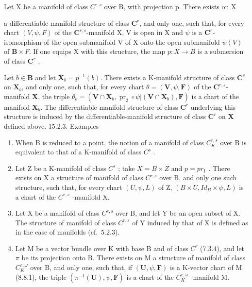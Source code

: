 Let X be a manifold of class \(C^{r,s}\) over B, with projection p. There exists on X

a differentiable-manifold structure of class \(\mathbf{C}^{r}\), and only one, such that, for every chart \((V,\psi,F)\) of the \(\mathbf{C}^{r,s}\)-manifold X, V is open in X and \(\psi\) is a \(\mathbf{C}^{r}\)-isomorphism of the open submanifold V of X onto the open submanifold \(\psi(V)\) of \(\mathbf{B}\times F\). If one equips X with this structure, the map \(p:X\to B\) is a submersion of class \(\mathbf{C}^{r}\) .

Let \(b \in \mathbf{B}\) and let \(\mathbf{X}_b = p^{-1}(b)\). There exists a K-manifold structure of class \(\mathbf{C}^s\) on \(\mathbf{X}_b\), and only one, such that, for every chart \(\theta = (\mathbf{V}, \psi, \mathbf{F})\) of the \(\mathbf{C}^{r,s}\)-manifold \(\mathbf{X}\), the triple \(\theta_b = (\mathbf{V} \cap \mathbf{X}_b, \operatorname{pr}_2 \circ \psi | (\mathbf{V} \cap \mathbf{X}_b), \mathbf{F})\) is a chart of the manifold \(\mathbf{X}_b\). The differentiable-manifold structure of class \(\mathbf{C}^r\) underlying this structure is induced by the differentiable-manifold structure of class \(\mathbf{C}^r\) on \(\mathbf{X}\) defined above.
\relax{}
15.2.3. Examples

\begin{enumerate}
\def\labelenumi{(\roman{enumi})}
\item
  When B is reduced to a point, the notion of a manifold of class \(C_{K}^{r,s}\) over B is equivalent to that of a K-manifold of class \(C^{s}\) .
\item
  Let Z be a K-manifold of class \(C^{s}\) ; take \(X = B \times Z\) and \(p = pr_{1}\) . There exists on X a structure of manifold of class \(C^{r,s}\) over B, and only one such structure, such that, for every chart \((U, \psi, L)\) of Z, \((B \times U, Id_{B} \times \psi, L)\) is a chart of the \(C^{r,s}\) -manifold X.
\item
  Let X be a manifold of class \(C^{r,s}\) over B, and let Y be an open subset of X. The structure of manifold of class \(C^{r,s}\) of Y induced by that of X is defined as in the case of manifolds (cf.~5.2.3).
\item
  Let M be a vector bundle over K with base B and of class \(C^{r}\) (7.3.4), and let \(\pi\) be its projection onto B. There exists on M a structure of manifold of class \(C_{K}^{r,\omega}\) over B, and only one, such that, if \((\mathbf{U},\psi,\mathbf{F})\) is a K-vector chart of M (8.8.1), the triple \((\pi^{-1}(\mathbf{U}),\psi,\mathbf{F})\) is a chart of the \(C_{K}^{r,\omega}\) -manifold M.
\end{enumerate}

